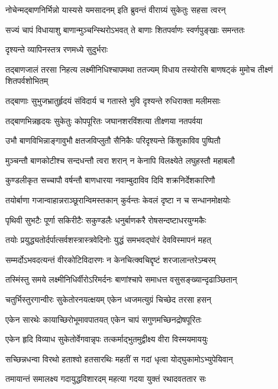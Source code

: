\twolineshloka
{नोचेन्मद्बाणनिर्भिन्नो यास्यसे यमसादनम्}
{इति ब्रुवन्तं वीराग्र्यं सुकेतुः सहसा त्वरन्}%

\twolineshloka
{सज्यं चापं विधायाशु बाणान्मुञ्चन्स्थिरोऽभवत्}
{ते बाणाः शितपर्वाणः स्वर्णपुङ्खाः समन्ततः}%

दृश्यन्ते व्यापिनस्तत्र रणमध्ये सुदुर्भराः

\fourlineindentedshloka
{तद्बाणजालं तरसा निहत्य}
{लक्ष्मीनिधिश्चापमथा ततज्यम्}
{विधाय तस्योरसि बाणषट्कं}
{मुमोच तीक्ष्णं शितपर्वशोभितम्}%

\twolineshloka
{तद्बाणाः सुभुजभ्रातुर्हृदयं संविदार्य च}
{गतास्ते भुवि दृश्यन्ते रुधिराक्ता मलीमसाः}%

\twolineshloka
{तद्बाणभिन्नहृदयः सुकेतुः कोपपूरितः}
{जघानशरविंशत्या तीक्ष्णया नतपर्वया}%

\twolineshloka
{उभौ बाणविभिन्नाङ्गावुभौ क्षतजविप्लुतौ}
{सैनिकैः परिदृश्यन्ते किंशुकाविव पुष्पितौ}%

\twolineshloka
{मुञ्चन्तौ बाणकोटीश्च सन्दधन्तौ त्वरा शरान्}
{न केनापि विलक्ष्येते लघुहस्तौ महाबलौ}%

\twolineshloka
{कुण्डलीकृत सच्चापौ वर्षन्तौ बाणधारया}
{नवाम्बुदाविव दिवि शक्रनिर्देशकारिणौ}%

\twolineshloka
{तयोर्बाणा गजान्वाहान्नराञ्छूरान्विमस्तकान्}
{कुर्वन्तः केवलं दृष्टा न च सन्धानमोक्षयोः}%

\twolineshloka
{पृथिवी सुभटैः पूर्णा सकिरीटैः सकुण्डलैः}
{धनुर्बाणकरै रोषसन्दष्टाधरयुग्मकैः}%

\twolineshloka
{तयोः प्रयुद्ध्यतोर्दर्पात्सर्वशस्त्रास्त्रवेदिनोः}
{युद्धं समभवद्घोरं देवविस्मापनं महत्}%

\twolineshloka
{सम्मर्दोऽभवदत्यन्तं वीरकोटिविदारणः}
{न केनचित्क्वचिद्दृष्टं शरजालान्तरेऽम्बरम्}%

\twolineshloka
{तस्मिंस्तु समये लक्ष्मीनिधिर्वीरोऽरिमर्दनः}
{बाणांश्चापे समाधत्त वसुसङ्ख्यान्दृढाञ्छितान्}%

\twolineshloka
{चतुर्भिस्तुरगान्वीरः सुकेतोरनयत्क्षयम्}
{एकेन ध्वजमत्युग्रं चिच्छेद तरसा हसन्}%

\twolineshloka
{एकेन सारथेः कायाच्छिरोभूमावपातयत्}
{एकेन चापं सगुणमच्छिनद्रोषपूरितः}%

\twolineshloka
{एकेन हृदि विव्याध सुकेतोर्वेगवान्नृपः}
{तत्कर्माद्भुतमुद्वीक्ष्य वीरा विस्मयमाययुः}%

\twolineshloka
{सच्छिन्नधन्वा विरथो हताश्वो हतसारथिः}
{महतीं स गदां धृत्वा योद्घुकामोऽभ्युपेयिवान्}%

\twolineshloka
{तमायान्तं समालक्ष्य गदायुद्धविशारदम्}
{महत्या गदया युक्तं रथादवततार सः}%

